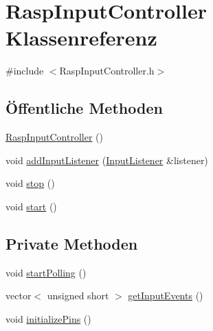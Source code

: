 \hypertarget{class_rasp_input_controller}{}\section{Rasp\+Input\+Controller Klassenreferenz}
\label{class_rasp_input_controller}


{\ttfamily \#include $<$Rasp\+Input\+Controller.\+h$>$}

\subsection*{Öffentliche Methoden}
\begin{DoxyCompactItemize}
\item 
\hyperlink{class_rasp_input_controller_a63a9e2ab7d0eb5aed2da6068454caa65}{Rasp\+Input\+Controller} ()
\item 
void \hyperlink{class_rasp_input_controller_a31d6f6befaea44931f0010175bfe1a17}{add\+Input\+Listener} (\hyperlink{class_input_listener}{Input\+Listener} \&listener)
\item 
void \hyperlink{class_rasp_input_controller_a7d9523be1a83acde964cb5d2b1d281ed}{stop} ()
\item 
void \hyperlink{class_rasp_input_controller_a8cb185caa124285987d6b98122cfbea4}{start} ()
\end{DoxyCompactItemize}
\subsection*{Private Methoden}
\begin{DoxyCompactItemize}
\item 
void \hyperlink{class_rasp_input_controller_a7e15590d321b382fcb5f4d70959a5cbe}{start\+Polling} ()
\item 
vector$<$ unsigned short $>$ \hyperlink{class_rasp_input_controller_a95a42703b4c0bca34ba966745bad5dff}{get\+Input\+Events} ()
\item 
void \hyperlink{class_rasp_input_controller_a5ffc6f68b0c74f31a9b595ff8acc49f1}{initialize\+Pins} ()
\end{DoxyCompactItemize}
